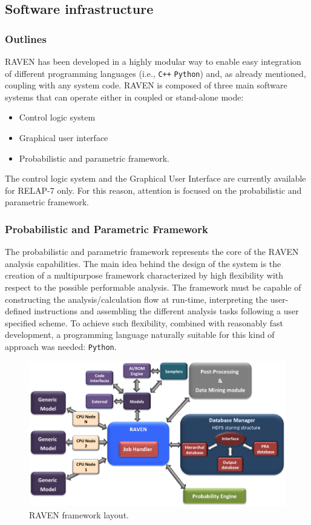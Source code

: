 \subsection{Software infrastructure}
\subsubsection{Outlines}
RAVEN has been developed in a highly modular way to enable easy integration of different programming languages (i.e., \texttt{C++} \texttt{Python}) and, as already mentioned, coupling with any system code.  
RAVEN is composed of three main software systems that can operate either in coupled or stand-alone mode:
\begin{itemize}
  \item Control logic system
  \item Graphical user interface
  \item Probabilistic and parametric framework.
\end{itemize}
The control logic system and the Graphical User Interface are currently available for RELAP-7 only. For this reason, attention is focused on the probabilistic and parametric framework.

\subsubsection{Probabilistic and Parametric Framework}
The probabilistic and parametric framework represents the core of the RAVEN analysis capabilities. The main idea behind the design of the system is the creation of a multipurpose framework characterized by high flexibility with respect to the possible performable analysis. The framework must be capable of constructing the analysis/calculation flow at run-time, interpreting the user-defined instructions and assembling the different analysis tasks following a user specified scheme. 
To achieve such flexibility, combined with reasonably fast development, a programming language naturally suitable for this kind of approach was needed: \texttt{Python}.  

\begin{figure}[ht]
  \centering
  \includegraphics[width=1.0\textwidth]  {pics/RavenFramework.png}
  \caption{RAVEN framework layout.}
  \label{fig:RAVENframeworkLayout}
\end{figure}

